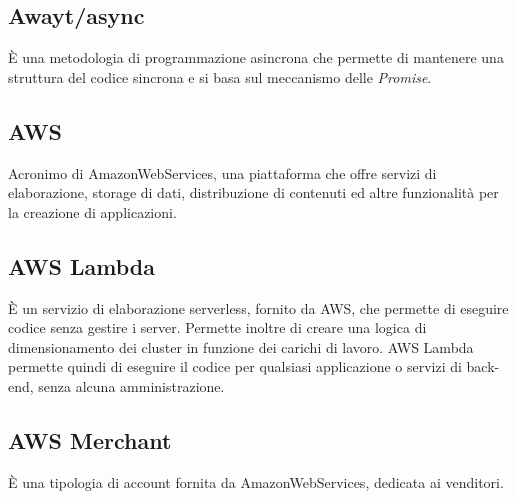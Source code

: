 \subsection*{Awayt/async} È una metodologia di programmazione asincrona che permette di mantenere una struttura del codice sincrona e si basa sul meccanismo delle \textit{Promise}.

\subsection*{AWS} Acronimo di AmazonWebServices, una piattaforma che offre servizi di elaborazione, storage di dati, distribuzione di contenuti ed altre funzionalità per la creazione di applicazioni.

\subsection*{AWS Lambda} È un servizio di elaborazione serverless, fornito da AWS, che permette di eseguire codice senza gestire i server. Permette inoltre di creare una logica di dimensionamento dei cluster in funzione dei carichi di lavoro. AWS Lambda permette quindi di eseguire il codice per qualsiasi applicazione o servizi di back-end, senza alcuna amministrazione.

\subsection*{AWS Merchant} È una tipologia di account fornita da AmazonWebServices, dedicata ai venditori.